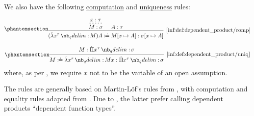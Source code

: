 \begin{definition}
  We also have the following \hyperref[rem:type_theory_rule_classification/equality/comp]{computation} and \hyperref[rem:type_theory_rule_classification/equality/uniq]{uniqueness} rules:
  \begin{paracol}{2}
    \begin{leftcolumn}
      \ParacolAlignmentHack
      \begin{equation*}\taglabel[\ensuremath{ \Pi_\beta }]{inf:def:dependent_product/comp}
        \begin{prooftree}
          \hypo{ x: \tau }
          \infer[dashed]1{ M: \sigma }

          \hypo{ A: \tau }
          \infer2[\ref{inf:def:dependent_product/comp}]{ (\qabs {x^\tau} M) A \syndefeq M[x \mapsto A]: \sigma[x \mapsto A] }
        \end{prooftree}
      \end{equation*}
    \end{leftcolumn}

    \begin{rightcolumn}
      \ParacolAlignmentHack
      \begin{equation*}\taglabel[\ensuremath{ \Pi_\eta }]{inf:def:dependent_product/uniq}
        \begin{prooftree}
          \hypo{ M: \qprod {x^\tau} \sigma }
          \infer1[\ref{inf:def:dependent_product/uniq}]{ M \syndefeq \qabs {x^\tau} M x: \qprod {x^\tau} \sigma },
        \end{prooftree}
      \end{equation*}
      where, as per , we require \( x \) not to be the variable of an open assumption.
    \end{rightcolumn}
  \end{paracol}
\end{definition}
\begin{comments}
  \item The rules are generally based on Martin-L\"of's rules from \cite[35]{MartinLöf1984IntuitionisticTypeTheory}, with computation and equality rules adapted from \cite[\S A.2.4]{UnivalentFoundationsProgram2024OctoberHoTT}. Due to , the latter prefer calling dependent products \enquote{dependent function types}.
\end{comments}


